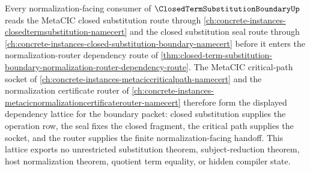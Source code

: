 \begin{proposition}
\label{prop:closed-term-substitution-boundary-metacic-normalization-dependency-lattice}
Every normalization-facing consumer of $\ClosedTermSubstitutionBoundaryUp$ reads the MetaCIC closed substitution route through \autoref{ch:concrete-instances-closedtermsubstitution-namecert} and the closed substitution seal route through \autoref{ch:concrete-instances-closed-substitution-boundary-namecert} before it enters the normalization-router dependency route of \autoref{thm:closed-term-substitution-boundary-normalization-router-dependency-route}. The MetaCIC critical-path socket of \autoref{ch:concrete-instances-metaciccriticalpath-namecert} and the normalization certificate router of \autoref{ch:concrete-instances-metacicnormalizationcertificaterouter-namecert} therefore form the displayed dependency lattice for the boundary packet: closed substitution supplies the operation row, the seal fixes the closed fragment, the critical path supplies the socket, and the router supplies the finite normalization-facing handoff. This lattice exports no unrestricted substitution theorem, subject-reduction theorem, host normalization theorem, quotient term equality, or hidden compiler state.
\end{proposition}
